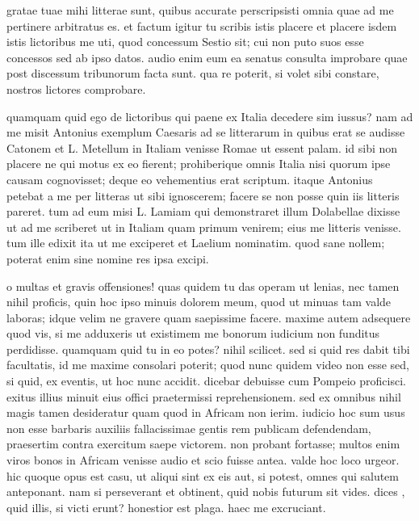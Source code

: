 


 gratae tuae mihi litterae sunt, quibus accurate perscripsisti omnia quae ad me pertinere arbitratus es. et factum igitur tu scribis istis placere et placere isdem istis lictoribus me uti, quod concessum Sestio sit; cui non puto suos esse concessos sed ab ipso datos. audio enim eum ea senatus consulta improbare quae post discessum tribunorum facta sunt. qua re poterit, si volet sibi constare, nostros lictores comprobare.

 quamquam quid ego de lictoribus qui paene ex Italia decedere sim iussus? nam ad me misit Antonius exemplum Caesaris ad se litterarum in quibus erat se audisse Catonem et L. Metellum in Italiam venisse Romae ut essent palam. id sibi non placere ne qui motus ex eo fierent; prohiberique omnis Italia nisi quorum ipse causam cognovisset; deque eo vehementius erat scriptum. itaque Antonius petebat a me per litteras ut sibi ignoscerem; facere se non posse quin iis litteris pareret. tum ad eum misi L. Lamiam qui demonstraret illum Dolabellae dixisse ut ad me scriberet ut in Italiam quam primum venirem; eius me litteris venisse. tum ille edixit ita ut me exciperet et Laelium nominatim. quod sane nollem; poterat enim sine nomine res ipsa excipi.

 o multas et gravis offensiones! quas quidem tu das operam ut lenias, nec tamen nihil proficis, quin hoc ipso minuis dolorem meum, quod ut minuas tam valde laboras; idque velim ne gravere quam saepissime facere. maxime autem adsequere quod vis, si me adduxeris ut existimem me bonorum iudicium non funditus perdidisse. quamquam quid tu in eo potes? nihil scilicet. sed si quid res dabit tibi facultatis, id me maxime consolari poterit; quod nunc quidem video non esse sed, si quid, ex eventis, ut hoc nunc accidit. dicebar debuisse cum Pompeio proficisci. exitus illius minuit eius offici praetermissi reprehensionem. sed ex omnibus nihil magis tamen desideratur quam quod in Africam non ierim. iudicio hoc sum usus non esse barbaris auxiliis fallacissimae gentis rem publicam defendendam, praesertim contra exercitum saepe victorem. non probant fortasse; multos enim viros bonos in Africam venisse audio et scio fuisse antea. valde hoc loco urgeor. hic quoque opus est casu, ut aliqui sint ex eis aut, si potest, omnes qui salutem anteponant. nam si perseverant et obtinent, quid nobis futurum sit vides. dices , quid illis, si victi erunt? honestior est plaga. haec me excruciant.

